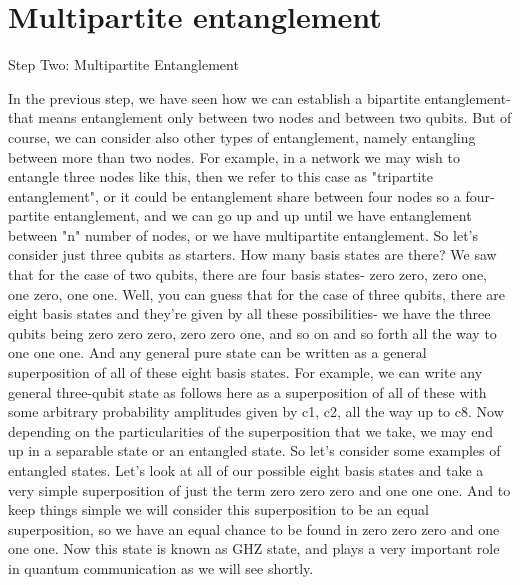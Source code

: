 \section{Multipartite entanglement}
\label{sec:14-2_multipartite}

Step Two: Multipartite Entanglement

In the previous step, we have seen how we can establish a bipartite entanglement- that means entanglement only between two nodes and between two qubits. But of course, we can consider also other types of entanglement, namely entangling between more than two nodes. For example, in a network we may wish to entangle three nodes like this, then we refer to this case as "tripartite entanglement", or it could be entanglement share between four nodes so a four-partite entanglement, and we can go up and up until we have entanglement between "n" number of nodes, or we have multipartite entanglement. So let's consider just three qubits as starters. How many basis states are there? We saw that for the case of two qubits, there are four basis states- zero zero, zero one, one zero, one one. Well, you can guess that for the case of three qubits, there are eight basis states and they're given by all these possibilities- we have the three qubits being zero zero zero, zero zero one, and so on and so forth all the way to one one one. And any general pure state can be written as a general superposition of all of these eight basis states. For example, we can write any general three-qubit state as follows here as a superposition of all of these with some arbitrary probability amplitudes given by c1, c2, all the way up to c8. Now depending on the particularities of the superposition that we take, we may end up in a separable state or an entangled state. So let's consider some examples of entangled states. Let's look at all of our possible eight basis states and take a very simple superposition of just the term zero zero zero and one one one. And to keep things simple we will consider this superposition to be an equal superposition, so we have an equal chance to be found in zero zero zero and one one one. Now this state is known as GHZ state, and plays a very important role in quantum communication as we will see shortly.

